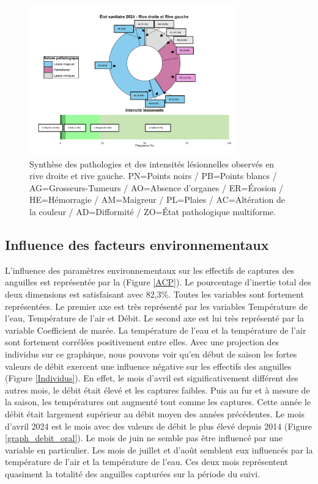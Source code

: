 \documentclass[11pt,titlepage,twoside]{article}\usepackage[]{graphicx}\usepackage[table]{xcolor}
\begin{document}
\begin{figure}[htpb]
\centering
\includegraphics[width=0.8\textwidth]{patho.png}
\caption{Synthèse des pathologies et des intensités lésionnelles observés en rive droite et rive gauche. PN=Points noirs / PB=Points blancs / AG=Grosseurs-Tumeurs / AO=Absence d’organes / ER=Érosion / HE=Hémorragie / AM=Maigreur / PL=Plaies / AC=Altération de la couleur / AD=Difformité / ZO=État pathologique multiforme.}
\label{patho}
\end{figure} 


\subsection{Influence des facteurs environnementaux }

L’influence des paramètres environnementaux sur les effectifs de captures des anguilles est représentée par la (Figure \ref{ACP}). Le pourcentage d’inertie total des deux dimensions est satisfaisant avec 82,3\%. Toutes les variables sont fortement représentées. Le premier axe est très représenté par les variables Température de l’eau, Température de l’air et Débit. Le second axe est lui très représenté par la variable Coefficient de marée. La température de l’eau et la température de l’air sont fortement corrélées positivement entre elles. Avec une projection des individus sur ce graphique, nous pouvons voir qu’en début de saison les fortes valeurs de débit exercent une influence négative sur les effectifs des anguilles (Figure \ref{Individus}). En effet, le mois d’avril est significativement différent des autres mois, le débit était élevé et les captures faibles. Puis au fur et à mesure de la saison, les températures ont augmenté tout comme les captures. Cette année le débit était largement supérieur au débit moyen des années précédentes. Le mois d’avril 2024 est le mois avec des valeurs de débit le plus élevé depuis 2014 (Figure \ref{graph_debit_oral}). Le mois de juin ne semble pas être influencé par une variable en particulier. Les mois de juillet et d’août semblent eux influencés par la température de l’air et la température de l’eau. Ces deux mois représentent quasiment la totalité des anguilles capturées sur la période du suivi.
\end{document}
